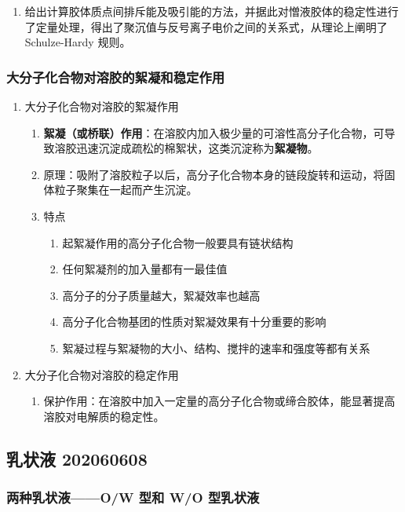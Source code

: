 \begin{enumerate}
    \item 给出计算胶体质点间排斥能及吸引能的方法，并据此对憎液胶体的稳定性进行了定量处理，得出了聚沉值与反号离子电价之间的关系式，从理论上阐明了 Schulze-Hardy 规则。
\end{enumerate}

\subsubsection{大分子化合物对溶胶的絮凝和稳定作用}

\begin{enumerate}
    \item 大分子化合物对溶胶的絮凝作用
    \begin{enumerate}
        \item \textbf{絮凝（或桥联）作用}：在溶胶内加入极少量的可溶性高分子化合物，可导致溶胶迅速沉淀成疏松的棉絮状，这类沉淀称为\textbf{絮凝物}。
        \item 原理：吸附了溶胶粒子以后，高分子化合物本身的链段旋转和运动，将固体粒子聚集在一起而产生沉淀。
        \item 特点
        \begin{enumerate}
            \item 起絮凝作用的高分子化合物一般要具有链状结构
            \item 任何絮凝剂的加入量都有一最佳值
            \item 高分子的分子质量越大，絮凝效率也越高
            \item 高分子化合物基团的性质对絮凝效果有十分重要的影响
            \item 絮凝过程与絮凝物的大小、结构、搅拌的速率和强度等都有关系
        \end{enumerate}
    \end{enumerate}
    \item 大分子化合物对溶胶的稳定作用
    \begin{enumerate}
        \item 保护作用：在溶胶中加入一定量的高分子化合物或缔合胶体，能显著提高溶胶对电解质的稳定性。
    \end{enumerate}
\end{enumerate}

\subsection{乳状液 202060608}

\subsubsection{两种乳状液——O/W 型和 W/O 型乳状液}

